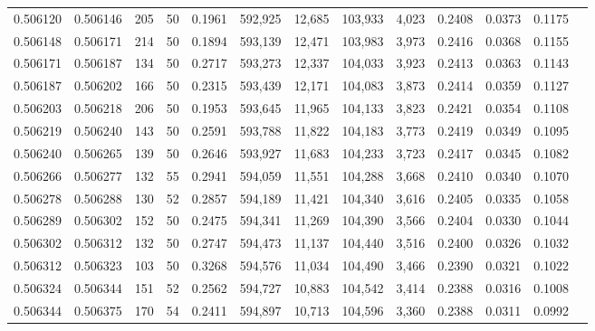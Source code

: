 \begin{tabular}{rrrrrrrrrrrrr}
0.506120 & 0.506146 & 205 &  50 &                                     0.1961 & 592,925 &  12,685 & 103,933 &   4,023 & 0.2408 & 0.0373 & 0.1175 \\
0.506148 & 0.506171 & 214 &  50 &                                     0.1894 & 593,139 &  12,471 & 103,983 &   3,973 & 0.2416 & 0.0368 & 0.1155 \\
0.506171 & 0.506187 & 134 &  50 &                                     0.2717 & 593,273 &  12,337 & 104,033 &   3,923 & 0.2413 & 0.0363 & 0.1143 \\
0.506187 & 0.506202 & 166 &  50 &                                     0.2315 & 593,439 &  12,171 & 104,083 &   3,873 & 0.2414 & 0.0359 & 0.1127 \\
0.506203 & 0.506218 & 206 &  50 &                                     0.1953 & 593,645 &  11,965 & 104,133 &   3,823 & 0.2421 & 0.0354 & 0.1108 \\
0.506219 & 0.506240 & 143 &  50 &                                     0.2591 & 593,788 &  11,822 & 104,183 &   3,773 & 0.2419 & 0.0349 & 0.1095 \\
0.506240 & 0.506265 & 139 &  50 &                                     0.2646 & 593,927 &  11,683 & 104,233 &   3,723 & 0.2417 & 0.0345 & 0.1082 \\
0.506266 & 0.506277 & 132 &  55 &                                     0.2941 & 594,059 &  11,551 & 104,288 &   3,668 & 0.2410 & 0.0340 & 0.1070 \\
0.506278 & 0.506288 & 130 &  52 &                                     0.2857 & 594,189 &  11,421 & 104,340 &   3,616 & 0.2405 & 0.0335 & 0.1058 \\
0.506289 & 0.506302 & 152 &  50 &                                     0.2475 & 594,341 &  11,269 & 104,390 &   3,566 & 0.2404 & 0.0330 & 0.1044 \\
0.506302 & 0.506312 & 132 &  50 &                                     0.2747 & 594,473 &  11,137 & 104,440 &   3,516 & 0.2400 & 0.0326 & 0.1032 \\
0.506312 & 0.506323 & 103 &  50 &                                     0.3268 & 594,576 &  11,034 & 104,490 &   3,466 & 0.2390 & 0.0321 & 0.1022 \\
0.506324 & 0.506344 & 151 &  52 &                                     0.2562 & 594,727 &  10,883 & 104,542 &   3,414 & 0.2388 & 0.0316 & 0.1008 \\
0.506344 & 0.506375 & 170 &  54 &                                     0.2411 & 594,897 &  10,713 & 104,596 &   3,360 & 0.2388 & 0.0311 & 0.0992 \\

\end{tabular}
